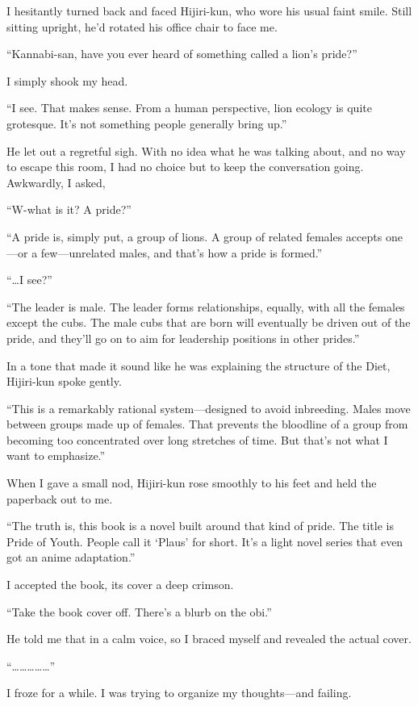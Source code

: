 \documentclass[
    a4paper,
    12pt,
    twoside,
    openany,
    UTF8,
    fontset=windows
]{ctexbook}
\begin{document}
I hesitantly turned back and faced Hijiri-kun, who wore his usual faint smile. Still sitting upright, he'd rotated his office chair to face me.

``Kannabi-san, have you ever heard of something called a lion's pride?''

I simply shook my head.

``I see. That makes sense. From a human perspective, lion ecology is quite grotesque. It's not something people generally bring up.''

He let out a regretful sigh. With no idea what he was talking about, and no way to escape this room, I had no choice but to keep the conversation going. Awkwardly, I asked,

``W-what is it? A pride?''

``A pride is, simply put, a group of lions. A group of related females accepts one---or a few---unrelated males, and that's how a pride is formed.''

``\dots I see?''

``The leader is male. The leader forms relationships, equally, with all the females except the cubs. The male cubs that are born will eventually be driven out of the pride, and they'll go on to aim for leadership positions in other prides.''

In a tone that made it sound like he was explaining the structure of the Diet, Hijiri-kun spoke gently.

``This is a remarkably rational system---designed to avoid inbreeding. Males move between groups made up of females. That prevents the bloodline of a group from becoming too concentrated over long stretches of time. But that's not what I want to emphasize.''

When I gave a small nod, Hijiri-kun rose smoothly to his feet and held the paperback out to me.

``The truth is, this book is a novel built around that kind of pride. The title is Pride of Youth. People call it `Plaus' for short. It's a light novel series that even got an anime adaptation.''

I accepted the book, its cover a deep crimson.

``Take the book cover off. There's a blurb on the obi.''

He told me that in a calm voice, so I braced myself and revealed the actual cover.

``\dots\dots\dots\dots\dots''

I froze for a while. I was trying to organize my thoughts---and failing.
\end{document}
